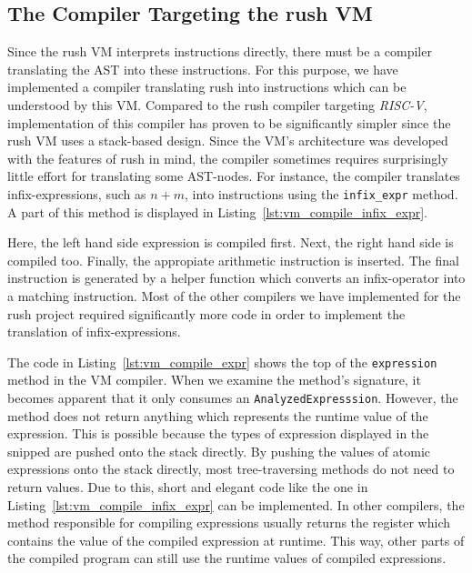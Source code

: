 \subsection{The Compiler Targeting the rush VM}

Since the rush VM interprets instructions directly, there must be a compiler translating the AST into these instructions.
For this purpose, we have implemented a compiler translating rush into instructions which can be understood by this VM.
Compared to the rush compiler targeting \emph{RISC-V},
implementation of this compiler has proven to be significantly simpler since the rush VM uses a stack-based design.
Since the VM's architecture was developed with the features of rush in mind,
the compiler sometimes requires surprisingly little effort for translating some AST-nodes.
For instance, the compiler translates infix-expressions, such as $n + m$, into instructions using the \texttt{infix\_expr} method.
A part of this method is displayed in Listing~\ref{lst:vm_compile_infix_expr}.


Here, the left hand side expression is compiled first.
Next, the right hand side is compiled too.
Finally, the appropiate arithmetic instruction is inserted.
The final instruction is generated by a helper function which converts an infix-operator into a matching instruction.
Most of the other compilers we have implemented for the rush project required significantly more code in order to implement the translation of infix-expressions.


The code in Listing~\ref{lst:vm_compile_expr} shows the top of the \texttt{expression} method in the VM compiler.
When we examine the method's signature, it becomes apparent that it only consumes an \texttt{AnalyzedExpresssion}.
However, the method does not return anything which represents the runtime value of the expression.
This is possible because the types of expression displayed in the snipped are pushed onto the stack directly.
By pushing the values of atomic expressions onto the stack directly, most tree-traversing methods do not need to return values.
Due to this, short and elegant code like the one in Listing~\ref{lst:vm_compile_infix_expr} can be implemented.
In other compilers, the method responsible for compiling expressions usually returns the register which contains the value of the compiled expression at runtime.
This way, other parts of the compiled program can still use the runtime values of compiled expressions.

